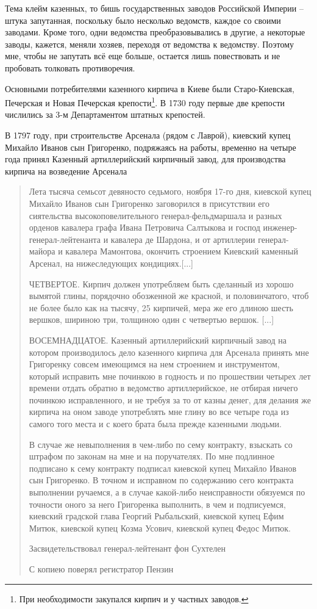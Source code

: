 Тема клейм казенных, то бишь государственных заводов Российской Империи – штука запутанная, поскольку было несколько ведомств, каждое со своими заводами. Кроме того, одни ведомства преобразовывались в другие, а некоторые заводы, кажется, меняли хозяев, переходя от ведомства к ведомству. Поэтому мне, чтобы не запутать всё еще больше, остается лишь повествовать и не пробовать толковать противоречия.

Основными потребителями казенного кирпича в Киеве были Старо-Киевская, Печерская и Новая Печерская крепости\footnote{При необходимости закупался кирпич и у частных заводов.}. В 1730 году первые две крепости числились за 3-м Департаментом штатных крепостей.

В 1797 году, при строительстве Арсенала (рядом с Лаврой), киевский купец Михайло Иванов сын Григоренко, подряжаясь на работы, временно на четыре года принял Казенный артиллерийский кирпичный завод, для производства кирпича на возведение Арсенала

\begin{quotation}
Лета тысяча семьсот девяносто седьмого, ноября 17-го дня, киевской купец Михайло Иванов сын Григоренко заговорился в присутствии его сиятельства высокоповелительного генерал-фельдмаршала и разных орденов кавалера графа Ивана Петровича Салтыкова и господ инженер-генерал-лейтенанта и кавалера де Шардона, и от артиллерии генерал-майора и кавалера Мамонтова, окончить строением Киевский каменный Арсенал, на нижеследующих кондициях.[...]

ЧЕТВЕРТОЕ. Кирпич должен употребляем быть сделанный из хорошо вымятой глины, порядочно обозженной же красной, и половинчатого, чтоб не более было как на тысячу, 25 кирпичей, мера же его длиною шесть вершков, шириною три, толщиною один с четвертью вершок. [...]

ВОСЕМНАДЦАТОЕ. Казенный артиллерийский кирпичный завод на котором производилось дело казенного кирпича для Арсенала принять мне Григоренку совсем имеющимся на нем строением и инструментом, который исправить мне починкою в годность и по прошествии четырех лет времени отдать обратно в ведомство артиллерийское, не отбирая ничего починкою исправленного, и не требуя за то от казны денег, для делания же кирпича на оном заводе употреблять мне глину во все четыре года из самого того места и с коего брата была прежде казенными людьми.

В случае же невыполнения в чем-либо по сему контракту, взыскать со штрафом по законам на мне и на поручателях. По мне подлинное подписано к сему контракту подписал киевской купец Михайло Иванов сын Григоренко. В точном и исправном по содержанию сего контракта выполнении ручаемся, а в случае какой-либо неисправности обязуемся по точности оного за него Григоренка выполнить, в чем и подписуемся, киевский градской глава Георгий Рыбальский, киевской купец Ефим Митюк, киевской купец Козма Усович, киевской купец Федос Митюк.

Засвидетельствовал генерал-лейтенант фон Сухтелен

С копиею поверял регистратор Пензин
\end{quotation}

